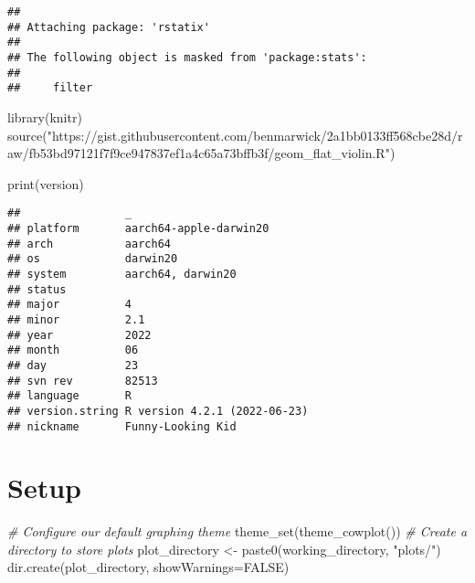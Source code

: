\documentclass[
]{book}
\newenvironment{Shaded}{\begin{snugshade}}{\end{snugshade}}
\newcommand{\AttributeTok}[1]{\textcolor[rgb]{0.77,0.63,0.00}{#1}}
\newcommand{\CommentTok}[1]{\textcolor[rgb]{0.56,0.35,0.01}{\textit{#1}}}
\newcommand{\ConstantTok}[1]{\textcolor[rgb]{0.00,0.00,0.00}{#1}}
\newcommand{\FunctionTok}[1]{\textcolor[rgb]{0.00,0.00,0.00}{#1}}
\newcommand{\NormalTok}[1]{#1}
\newcommand{\OtherTok}[1]{\textcolor[rgb]{0.56,0.35,0.01}{#1}}
\newcommand{\StringTok}[1]{\textcolor[rgb]{0.31,0.60,0.02}{#1}}
\begin{document}
\begin{verbatim}
## 
## Attaching package: 'rstatix'
## 
## The following object is masked from 'package:stats':
## 
##     filter
\end{verbatim}

\begin{Shaded}
\begin{Highlighting}[]
\FunctionTok{library}\NormalTok{(knitr)}
\FunctionTok{source}\NormalTok{(}\StringTok{"https://gist.githubusercontent.com/benmarwick/2a1bb0133ff568cbe28d/raw/fb53bd97121f7f9ce947837ef1a4c65a73bffb3f/geom\_flat\_violin.R"}\NormalTok{)}
\end{Highlighting}
\end{Shaded}

\begin{Shaded}
\begin{Highlighting}[]
\FunctionTok{print}\NormalTok{(version)}
\end{Highlighting}
\end{Shaded}

\begin{verbatim}
##                _                           
## platform       aarch64-apple-darwin20      
## arch           aarch64                     
## os             darwin20                    
## system         aarch64, darwin20           
## status                                     
## major          4                           
## minor          2.1                         
## year           2022                        
## month          06                          
## day            23                          
## svn rev        82513                       
## language       R                           
## version.string R version 4.2.1 (2022-06-23)
## nickname       Funny-Looking Kid
\end{verbatim}

\hypertarget{setup}{%
\section{Setup}\label{setup}}

\begin{Shaded}
\begin{Highlighting}[]
\CommentTok{\# Configure our default graphing theme}
\FunctionTok{theme\_set}\NormalTok{(}\FunctionTok{theme\_cowplot}\NormalTok{())}
\CommentTok{\# Create a directory to store plots}
\NormalTok{plot\_directory }\OtherTok{\textless{}{-}} \FunctionTok{paste0}\NormalTok{(working\_directory, }\StringTok{"plots/"}\NormalTok{)}
\FunctionTok{dir.create}\NormalTok{(plot\_directory, }\AttributeTok{showWarnings=}\ConstantTok{FALSE}\NormalTok{)}
\end{Highlighting}
\end{Shaded}
\end{document}
